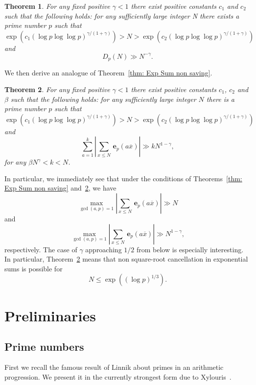 \documentclass[12pt]{amsart}
\newtheorem{theorem}{Theorem}
\numberwithin{equation}{section}
\numberwithin{theorem}{section}
\numberwithin{table}{section}
\numberwithin{figure}{section}
\def\le{\leqslant}
\def\e{\mathbf{e}}
\def\xbar{\overline{x}}
\def\({\left(}
\def\){\right)}
\def\e{{\mathbf{\,e}}}
\begin{document}
\begin{theorem}
\label{thm: Discrep power non saving} 
For any fixed positive  $\gamma< 1$ there exist positive constants $c_1$ and $c_2$ such that
the following holds: for any sufficiently large integer N there exists a prime number $p$
such that   
$$
\exp\(c_1(\log p\log\log p)^{\gamma/(1+\gamma)}\) > N > \exp\(c_2(\log p\log\log p)^{\gamma/(1+\gamma)}\)
$$
and 
$$
D_p(N)\gg  N^{-\gamma} .
$$
\end{theorem}

We  then derive an analogue of  Theorem~\ref{thm: Exp Sum non saving}.  


\begin{theorem}
\label{thm: Exp Sum non large power saving} 
For any fixed positive  $\gamma< 1$  there exist positive constants $c_1$, $c_2$ and $\beta$ 
such that the following holds: for any sufficiently large integer $N$ there is a 
prime number $p$ such that  
$$
\exp\(c_1(\log p\log\log p)^{\gamma/(1+\gamma)}\) > N > \exp\(c_2(\log p\log\log p)^{\gamma/(1+\gamma)}\)
$$
and 
$$
\sum_{a=1}^k\left|\sum_{x\le N}\e_p\(a \xbar\)\right|\gg kN^{1-\gamma},
$$
for any $\beta N^{\gamma}<k<N$.
\end{theorem}

In particular, we immediately see that under the conditions of Theorems~\ref{thm: Exp Sum non saving}  
and~\ref{thm: Exp Sum non large power saving}, we have 
\begin{equation}
\label{eq: Max Exp Sum}
\max_{\gcd(a,p)=1} \left|\sum_{x\le N}\e_p\(a \xbar\)\right|\gg N 
\end{equation}
and 
$$
\max_{\gcd(a,p)=1} \left|\sum_{x\le N}\e_p\(a \xbar\)\right|\gg N^{1-\gamma},
$$
 respectively.  The case of $\gamma$ approaching $1/2$ from below  is especially 
 interesting. In particular,  Theorem~\ref{thm: Exp Sum non large power saving} means that 
 non square-root cancellation in exponential sums is possible for 
 $$
N \le  \exp\((\log p)^{1/3}\).
$$
 
\section{Preliminaries}

\subsection{Prime numbers}

First we recall the famous result of Linnik about primes in an arithmetic progression.
We present it in the currently strongest form due to Xylouris~\cite{Xy}.
\end{document}
